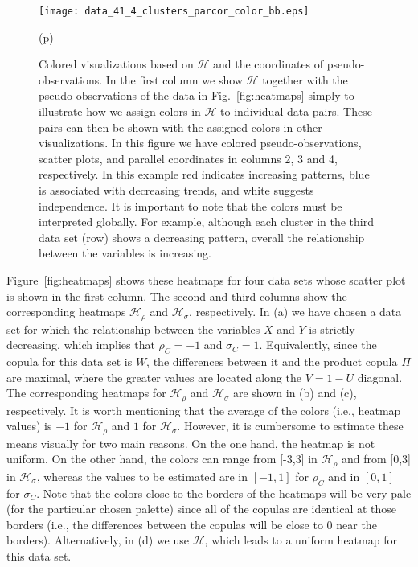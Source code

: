 \documentclass[journal]{vgtc}                %
\begin{document}
\begin{figure*}[ht!]
\begin{minipage}{0.20\textwidth}
     \texttt{[image: data\_41\_4\_clusters\_parcor\_color\_bb.eps]}\\ \vspace{0.4cm}

   \hspace{-0.20cm} \footnotesize (p) 
  \end{minipage} 
  
  
  \caption{Colored visualizations based on $\mathcal{H}$ and the coordinates of pseudo-observations. In the first column we show $\mathcal{H}$ together with the pseudo-observations of the data in Fig.~\ref{fig:heatmaps} simply to illustrate how we assign colors in $\mathcal{H}$ to individual data pairs. These pairs can then be shown with the assigned colors in other visualizations. In this figure we have colored pseudo-observations, scatter plots, and parallel coordinates in columns 2, 3 and 4, respectively. In this example red indicates increasing patterns, blue is associated with decreasing trends, and white suggests independence. It is important to note that the colors must be interpreted globally. For example, although each cluster in the third data set (row) shows a decreasing pattern, overall the relationship between the variables is increasing.}
\label{fig:coloredvisualizations}
\end{figure*}

Figure~\ref{fig:heatmaps} shows these heatmaps for four data sets whose scatter plot is shown in the first column. The second and third columns show the corresponding heatmaps $\mathcal{H}_{\rho}$ and $\mathcal{H}_{\sigma}$, respectively. In (a) we have chosen a data set for which the relationship between the variables $X$ and $Y$ is strictly decreasing, which implies that $\rho_{C} = -1$ and $\sigma_{C} = 1$. Equivalently, since the copula for this data set is $W$, the differences between it and the product copula $\Pi$ are maximal, where the greater values are located along the $V = 1-U$ diagonal. The corresponding heatmaps for $\mathcal{H}_{\rho}$ and $\mathcal{H}_{\sigma}$ are shown in (b) and (c), respectively. It is worth mentioning that the average of the colors (i.e., heatmap values) is $-1$ for $\mathcal{H}_{\rho}$ and $1$ for $\mathcal{H}_{\sigma}$. However, it is cumbersome to estimate these means visually for two main reasons. On the one hand, the heatmap is not uniform. On the other hand, the colors can range from [-3,3] in $\mathcal{H}_{\rho}$ and from [0,3] in $\mathcal{H}_{\sigma}$, whereas the values to be estimated are in $[-1,1]$ for $\rho_{C}$ and in $[0,1]$ for $\sigma_{C}$. Note that the colors close to the borders of the heatmaps will be very pale (for the particular chosen palette) since all of the copulas are identical at those borders (i.e., the differences between the copulas will be close to 0 near the borders). Alternatively, in (d) we use $\mathcal{H}$, which leads to a uniform heatmap for this data set.
\end{document}
